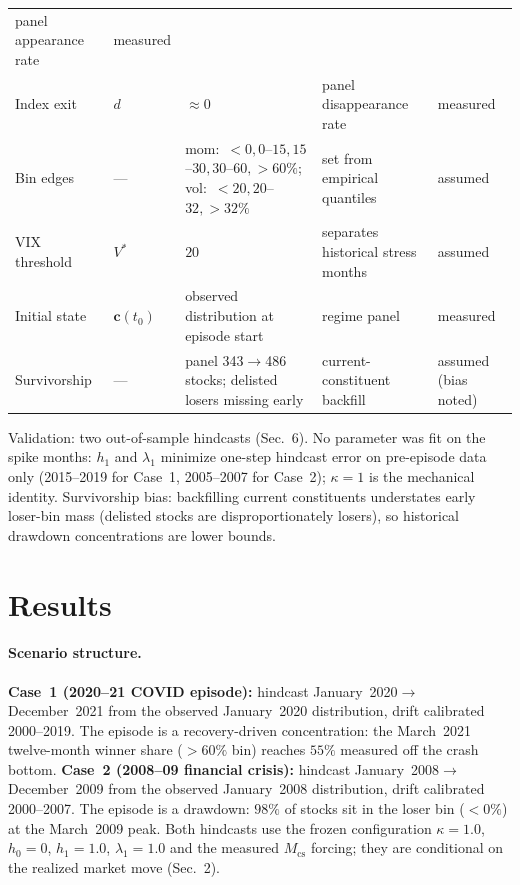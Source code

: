 \documentclass[11pt,a4paper]{article}
\begin{document}
{\begin{longtable}{@{}llp{3.6cm}p{2.9cm}p{1.9cm}@{}}
  panel appearance rate & measured \\
Index exit & $d$ & $\approx 0$ &
  panel disappearance rate & measured \\
Bin edges & --- & mom:\ $<0,0$--$15,15$--$30,30$--$60,>60\%$; vol:\
  $<20,20$--$32,>32\%$ &
  set from empirical quantiles & assumed \\
VIX threshold & $V^*$ & $20$ &
  separates historical stress months & assumed \\
Initial state & $\mathbf{c}(t_0)$ & observed distribution at episode start &
  regime panel & measured \\
Survivorship & --- & panel 343$\to$486 stocks; delisted losers missing early &
  current-constituent backfill & assumed (bias noted) \\
\end{longtable}
}
Validation: two out-of-sample hindcasts (Sec.~6).  No parameter was fit on
the spike months: $h_1$ and $\lambda_1$ minimize one-step hindcast error on
pre-episode data only (2015--2019 for Case~1, 2005--2007 for Case~2);
$\kappa=1$ is the mechanical identity.  Survivorship bias: backfilling
current constituents understates early loser-bin mass (delisted stocks are
disproportionately losers), so historical drawdown concentrations are lower
bounds.

\section{Results}
\label{sec:results}
\paragraph{Scenario structure.} \textbf{Case~1 (2020--21 COVID episode):}
hindcast January~2020$\to$December~2021 from the observed January~2020
distribution, drift calibrated 2000--2019.  The episode is a
recovery-driven concentration: the March~2021 twelve-month winner share
($>60\%$ bin) reaches $55\%$ measured off the crash bottom.
\textbf{Case~2 (2008--09 financial crisis):} hindcast January~2008$\to$
December~2009 from the observed January~2008 distribution, drift calibrated
2000--2007.  The episode is a drawdown: $98\%$ of stocks sit in the loser
bin ($<0\%$) at the March~2009 peak.  Both hindcasts use the frozen
configuration $\kappa=1.0$, $h_0=0$, $h_1=1.0$, $\lambda_1=1.0$ and the
measured $M_{\mathrm{cs}}$ forcing; they are conditional on the realized
market move (Sec.~2).
\end{document}
